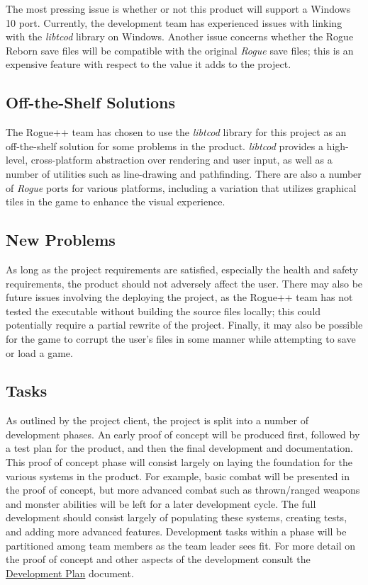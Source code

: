 \documentclass[12pt, titlepage]{article}
\begin{document}
	The most pressing issue is whether or not this product will support a Windows 10 port.  Currently, the development team has experienced issues with linking with the \textit{libtcod} library on Windows.  Another issue concerns whether the Rogue Reborn save files will be compatible with the original \textit{Rogue} save files; this is an expensive feature with respect to the value it adds to the project. 

	\subsection{Off-the-Shelf Solutions}

	The Rogue++ team has chosen to use the \textit{libtcod} library for this project as an off-the-shelf solution for some problems in the product.  \textit{libtcod} provides a high-level, cross-platform abstraction over rendering and user input, as well as a number of utilities such as line-drawing and pathfinding.  There are also a number of \textit{Rogue} ports for various platforms, including a variation that utilizes graphical tiles in the game to enhance the visual experience.

	\subsection{New Problems}

	As long as the project requirements are satisfied, especially the health and safety requirements, the product should not adversely affect the user.  There may also be future issues involving the deploying the project, as the Rogue++ team has not tested the executable without building the source files locally; this could potentially require a partial rewrite of the project.  Finally, it may also be possible for the game to corrupt the user's files in some manner while attempting to save or load a game.

	\subsection{Tasks}

	As outlined by the project client, the project is split into a number of development phases.  An early proof of concept will be produced first, followed by a test plan for the product, and then the final development and documentation.  This proof of concept phase will consist largely on laying the foundation for the various systems in the product.  For example, basic combat will be presented in the proof of concept, but more advanced combat such as thrown/ranged weapons and monster abilities will be left for a later development cycle.  The full development should consist largely of populating these systems, creating tests, and adding more advanced features.  Development tasks within a phase will be partitioned among team members as the team leader sees fit.  For more detail on the proof of concept and other aspects of the development consult the \href{../DevelopmentPlan/DevelopmentPlan.pdf}{Development Plan} document.
\end{document}
